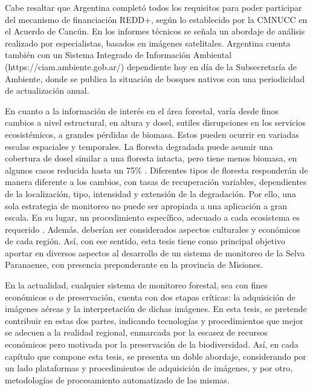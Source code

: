 Cabe resaltar que Argentina completó todos los requisitos para poder participar del mecanismo de financiación REDD+, según lo establecido por la CMNUCC en el Acuerdo de Cancún. En los informes técnicos se señala un abordaje de análisis realizado por especialistas, basados en imágenes satelitales. Argentina cuenta también con un Sistema Integrado de Información Ambiental (https://ciam.ambiente.gob.ar/) dependiente hoy en día de la Subsecretaría de Ambiente, donde se publica la situación de bosques nativos con una periodicidad de actualización anual.

En cuanto a la información de interés en el área forestal, varía desde finos cambios a nivel estructural, en altura y dosel, sutiles disrupciones en los servicios ecosistémicos, a grandes pérdidas de biomasa. Estos pueden ocurrir en variadas escalas espaciales y temporales. La floresta degradada puede asumir una cobertura de dosel similar a una floresta intacta, pero tiene menos biomasa, en algunos casos reducida hasta un 75\% \cite{change_report_2006}. Diferentes tipos de floresta responderán de manera diferente a los cambios, con tasas de recuperación variables, dependientes de la localización, tipo, intensidad y extensión de la degradación. Por ello, una sola estrategia de monitoreo no puede ser apropiada a una aplicación a gran escala. En su lugar, un procedimiento específico, adecuado a cada ecosistema es requerido \cite{mitchell_current_2017}. Además. deberían ser considerados aspectos culturales y económicos de cada región. Así, con ese sentido, esta tesis tiene como principal objetivo aportar en diversos aspectos al desarrollo de un sistema de monitoreo de la Selva Paranaense, con presencia preponderante en la provincia de Misiones.

En la actualidad, cualquier sistema de monitoreo forestal, sea con fines económicos o de preservación, cuenta con dos etapas críticas: la adquisición de imágenes aéreas y la interpretación de dichas imágenes. En esta tesis, se pretende contribuir en estas dos partes, indicando tecnologías y procedimientos que mejor se adecuen a la realidad regional, enmarcada por la escasez de recursos económicos pero motivada por la preservación de la biodiversidad. Así, en cada capítulo que compone esta tesis, se presenta un doble abordaje, considerando por un lado plataformas y  procedimientos de adquisición de imágenes, y por otro, metodologías de procesamiento automatizado de las mismas.
